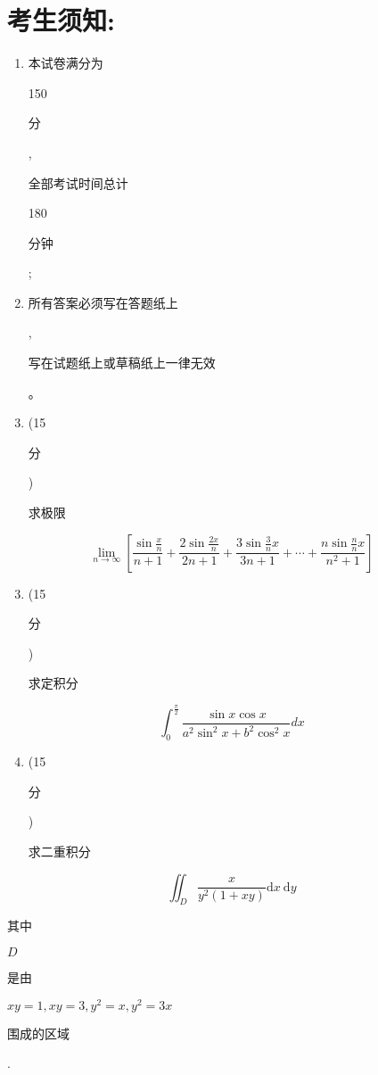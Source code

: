 \documentclass[10pt]{article}
\begin{document}
\section{考生须知:}
\begin{enumerate}
  \item \begin{CJK}{UTF8}{mj}本试卷满分为\end{CJK} 150 \begin{CJK}{UTF8}{mj}分\end{CJK}, \begin{CJK}{UTF8}{mj}全部考试时间总计\end{CJK} 180 \begin{CJK}{UTF8}{mj}分钟\end{CJK};

  \item \begin{CJK}{UTF8}{mj}所有答案必须写在答题纸上\end{CJK}, \begin{CJK}{UTF8}{mj}写在试题纸上或草稿纸上一律无效\end{CJK}。

  \item (15 \begin{CJK}{UTF8}{mj}分\end{CJK}) \begin{CJK}{UTF8}{mj}求极限\end{CJK}

\end{enumerate}
$$
\lim _{n \rightarrow \infty}\left[\frac{\sin \frac{x}{n}}{n+1}+\frac{2 \sin \frac{2 x}{n}}{2 n+1}+\frac{3 \sin \frac{3}{n} x}{3 n+1}+\cdots+\frac{n \sin \frac{n}{n} x}{n^{2}+1}\right]
$$

\begin{enumerate}
  \setcounter{enumi}{2}
  \item (15 \begin{CJK}{UTF8}{mj}分\end{CJK}) \begin{CJK}{UTF8}{mj}求定积分\end{CJK}
\end{enumerate}
$$
\int_{0}^{\frac{\pi}{2}} \frac{\sin x \cos x}{a^{2} \sin ^{2} x+b^{2} \cos ^{2} x} d x
$$

\begin{enumerate}
  \setcounter{enumi}{3}
  \item (15 \begin{CJK}{UTF8}{mj}分\end{CJK}) \begin{CJK}{UTF8}{mj}求二重积分\end{CJK}
\end{enumerate}
$$
\iint_{D} \frac{x}{y^{2}(1+x y)} \mathrm{d} x \mathrm{~d} y
$$
\begin{CJK}{UTF8}{mj}其中\end{CJK} $D$ \begin{CJK}{UTF8}{mj}是由\end{CJK} $x y=1, x y=3, y^{2}=x, y^{2}=3 x$ \begin{CJK}{UTF8}{mj}围成的区域\end{CJK}.
\end{document}
